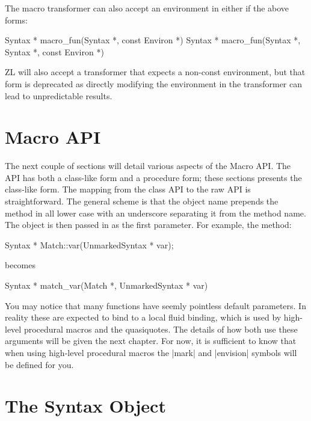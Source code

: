 The macro transformer can also accept an environment in either if the
above forms:
\begin{code}
Syntax * macro_fun(Syntax *, const Environ *)
Syntax * macro_fun(Syntax *, Syntax *, const Environ *)
\end{code}
ZL will also accept a transformer that expects a non-const
environment, but that form is deprecated as directly modifying the
environment in the transformer can lead to unpredictable results.

\section{Macro API}

The next couple of sections will detail various aspects of the Macro
API.  The API has both a class-like form and a procedure form; these
sections presents the class-like form.  The mapping from the class API
to the raw API is straightforward.  The general scheme is that the
object name prepends the method in all lower case with an underscore
separating it from the method name.  The object is then passed in as
the first parameter.  For example, the method:%
\begin{code}
Syntax * Match::var(UnmarkedSyntax * var);
\end{code}
becomes
\begin{code}
Syntax * match_var(Match *, UnmarkedSyntax * var)
\end{code}

You may notice that many functions have seemly pointless default
parameters.  In reality these are expected to bind to a local fluid
binding, which is used by high-level procedural macros and the
quasiquotes.  The details of how both use these arguments will be
given the next chapter.  For now, it is sufficient to know that when
using high-level procedural macros the |mark| and |envision| symbols
will be defined for you.

\section{The Syntax Object}
\label{syntax-obj}


